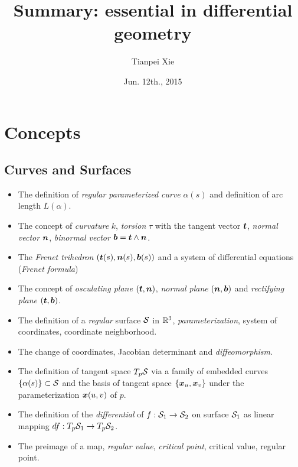 \documentclass[11pt]{article}
\begin{document}
\title{Summary: essential in differential geometry}
\author{ Tianpei Xie}
\date{ Jun. 12th., 2015 }
\maketitle
\tableofcontents
\newpage
\section{Concepts}
\subsection{Curves and Surfaces}
\begin{itemize}
\item The definition of \emph{regular parameterized curve} $\alpha(s)$ and definition of arc length $L(\alpha)$. 
\item The concept of \emph{curvature} $k$, \emph{torsion} $\tau$ with the tangent vector $\boldsymbol{t}$,  \emph{normal vector} $\boldsymbol{n}$, \emph{binormal vector} $\boldsymbol{b} = \boldsymbol{t}\wedge \boldsymbol{n}$. 
\item The \emph{Frenet trihedron} $(\boldsymbol{t}(s), \boldsymbol{n}(s), \boldsymbol{b}(s))$ and a system of differential equations (\emph{Frenet formula})

\item The concept of \emph{osculating plane} $(\boldsymbol{t}, \boldsymbol{n})$, \emph{normal plane} $(\boldsymbol{n}, \boldsymbol{b})$ and \emph{rectifying plane} $(\boldsymbol{t}, \boldsymbol{b})$.\\[5pt]

\item The definition of a \emph{regular} surface ${\mathcal S}$ in ${\mathbb R}^{3}$, \emph{parameterization}, system of coordinates, coordinate neighborhood.

\item The change of coordinates, Jacobian determinant and \emph{diffeomorphism}.

\item The definition of tangent space $T_{p}{\mathcal S}$ via a family of embedded curves $\left\{\alpha(s)\right\}\subset {\mathcal S}$ and the basis of tangent space $\left\{\boldsymbol{x}_{u}, \boldsymbol{x}_{v}\right\}$ under the parameterization $\boldsymbol{x}(u,v)$ of $p$.

\item The definition of the \emph{differential} of $f: {\mathcal S}_{1} \rightarrow {\mathcal S}_{2}$ on surface ${\mathcal S}_{1}$ as linear mapping $df: T_{p}{\mathcal S}_{1}\rightarrow T_{p}{\mathcal S}_{2}$.

\item The preimage of a map, \emph{regular value}, \emph{critical point}, critical value, regular point.  
\end{itemize}
\end{document}
